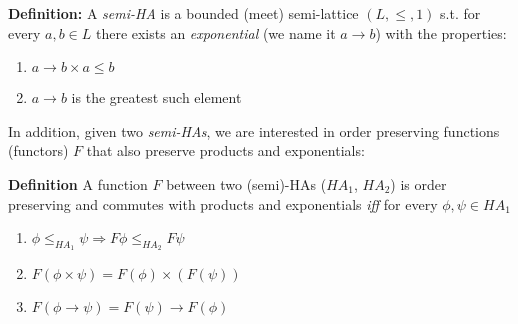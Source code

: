 			\begin{mdframed}
			\textbf{Definition:}
			A \textit{semi-HA} is a bounded (meet) semi-lattice $(L,\le, 1)$ 
			s.t. for every $a,b\in L$ there exists an \textit{exponential} 
			(we name it $a\rightarrow b$) 
			with the properties: 
			\begin{enumerate}
			\item $a\rightarrow b\times a\le b $
			\item $a\rightarrow b$ is the greatest such element
			\end{enumerate}
			\end{mdframed}
			
			
			In addition, given two \emph{semi-HAs}, we are 
			interested in order preserving 
			functions (functors) $F$ that also preserve products and exponentials: 
			\begin{mdframed}
				\textbf{Definition}
			A function $F$ between two (semi)-HAs ($HA_1$, $HA_2$) is order preserving
			and commutes with products and exponentials \emph{iff} for every 
			$\phi,\psi \in HA_1$
				\begin{enumerate}
				\item $\phi\le_{HA_1}\psi\Rightarrow F\phi\le_{HA_2}F\psi$
				\item{$F(\phi \times\psi) = F(\phi)\times(F(\psi))$} 
				\item $F(\phi\rightarrow \psi) = F(\psi)\rightarrow F(\phi)$
				\end{enumerate}
			\end{mdframed}
			
